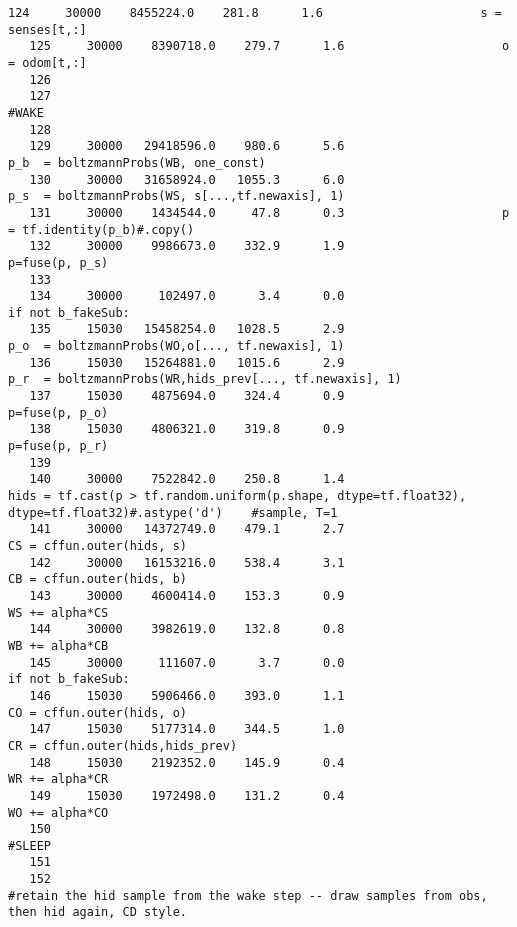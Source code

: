 \begin{lstlisting}[xrightmargin=0.05\linewidth,caption=Line by line profiling of the learnWeights\#learn function (boltzmann probs as an eager function), label=profiling:line_learn]
   124     30000    8455224.0    281.8      1.6                      s = senses[t,:]
   125     30000    8390718.0    279.7      1.6                      o = odom[t,:]
   126                                           
   127                                                               #WAKE
   128                                           
   129     30000   29418596.0    980.6      5.6                      p_b  = boltzmannProbs(WB, one_const)
   130     30000   31658924.0   1055.3      6.0                      p_s  = boltzmannProbs(WS, s[...,tf.newaxis], 1)
   131     30000    1434544.0     47.8      0.3                      p = tf.identity(p_b)#.copy()
   132     30000    9986673.0    332.9      1.9                      p=fuse(p, p_s)
   133                                           
   134     30000     102497.0      3.4      0.0                      if not b_fakeSub:
   135     15030   15458254.0   1028.5      2.9                          p_o  = boltzmannProbs(WO,o[..., tf.newaxis], 1)
   136     15030   15264881.0   1015.6      2.9                          p_r  = boltzmannProbs(WR,hids_prev[..., tf.newaxis], 1)
   137     15030    4875694.0    324.4      0.9                          p=fuse(p, p_o)
   138     15030    4806321.0    319.8      0.9                          p=fuse(p, p_r)
   139                                           
   140     30000    7522842.0    250.8      1.4                      hids = tf.cast(p > tf.random.uniform(p.shape, dtype=tf.float32), dtype=tf.float32)#.astype('d')    #sample, T=1
   141     30000   14372749.0    479.1      2.7                      CS = cffun.outer(hids, s)
   142     30000   16153216.0    538.4      3.1                      CB = cffun.outer(hids, b)
   143     30000    4600414.0    153.3      0.9                      WS += alpha*CS
   144     30000    3982619.0    132.8      0.8                      WB += alpha*CB
   145     30000     111607.0      3.7      0.0                      if not b_fakeSub:
   146     15030    5906466.0    393.0      1.1                          CO = cffun.outer(hids, o)
   147     15030    5177314.0    344.5      1.0                          CR = cffun.outer(hids,hids_prev)
   148     15030    2192352.0    145.9      0.4                          WR += alpha*CR
   149     15030    1972498.0    131.2      0.4                          WO += alpha*CO
   150                                                               #SLEEP
   151                                           
   152                                                               #retain the hid sample from the wake step -- draw samples from obs, then hid again, CD style.

\end{lstlisting}
